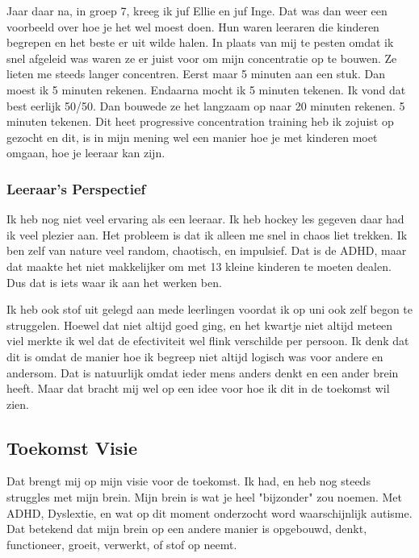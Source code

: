                 \bigskip
        
                \noindent Jaar daar na, in groep 7, kreeg ik juf Ellie en juf Inge. Dat was dan weer een voorbeeld over hoe je het wel moest doen. Hun waren leeraren die kinderen begrepen en het beste er uit wilde halen. In plaats van mij te pesten omdat ik snel afgeleid was waren ze er juist voor om mijn concentratie op te bouwen. Ze lieten me steeds langer concentren. Eerst maar 5 minuten aan een stuk. Dan moest ik 5 minuten rekenen. Endaarna mocht ik 5 minuten tekenen. Ik vond dat best eerlijk 50/50. Dan bouwede ze het langzaam op naar 20 minuten rekenen. 5 minuten tekenen. Dit heet progressive concentration training heb ik zojuist op gezocht en dit, is in mijn mening wel een manier hoe je met kinderen moet omgaan, hoe je leeraar kan zijn.
                
            \subsubsection{Leeraar's Perspectief}
                Ik heb nog niet veel ervaring als een leeraar. Ik heb hockey les gegeven daar had ik veel plezier aan. Het probleem is dat ik alleen me snel in chaos liet trekken. Ik ben zelf van nature veel random, chaotisch, en impulsief. Dat is de ADHD, maar dat maakte het niet makkelijker om met 13 kleine kinderen te moeten dealen. Dus dat is iets waar ik aan het werken ben.
                
                \bigskip
        
                \noindent Ik heb ook stof uit gelegd aan mede leerlingen voordat ik op uni ook zelf begon te struggelen. Hoewel dat niet altijd goed ging, en het kwartje niet altijd meteen viel merkte ik wel dat de efectiviteit wel flink verschilde per persoon. Ik denk dat dit is omdat de manier hoe ik begreep niet altijd logisch was voor andere en andersom. Dat is natuurlijk omdat ieder mens anders denkt en een ander brein heeft. Maar dat bracht mij wel op een idee voor hoe ik dit in de toekomst wil zien.
                
        \subsection{Toekomst Visie}
            Dat brengt mij op mijn visie voor de toekomst. Ik had, en heb nog steeds struggles met mijn brein. Mijn brein is wat je heel "bijzonder" zou noemen. Met ADHD, Dyslextie, en wat op dit moment onderzocht word waarschijnlijk autisme. Dat betekend dat mijn brein op een andere manier is opgebouwd, denkt, functioneer, groeit, verwerkt, of stof op neemt\cite{neurodivergent}. 
        
